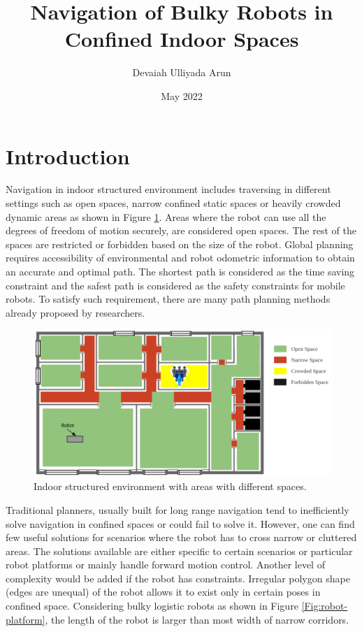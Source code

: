 \documentclass[rnd]{mas_proposal}
\title{Navigation of Bulky Robots in Confined Indoor Spaces}
\author{Devaiah Ulliyada Arun}
\date{May 2022}
\begin{document}
\maketitle

\pagestyle{plain}

\section{Introduction}
Navigation in indoor structured environment includes traversing in different settings such as open spaces, narrow confined static spaces or heavily crowded dynamic areas as shown in Figure \ref{Fig:indoor-map}. Areas where the robot can use all the degrees of freedom of motion securely, are considered open spaces. The rest of the spaces are restricted or forbidden based on the size of the robot. Global planning requires accessibility of environmental and robot odometric information to obtain an accurate and optimal path. The shortest path is considered as the time saving constraint and the safest path is considered as the safety constraints for mobile robots. To satisfy such requirement, there are many path planning methods already proposed by researchers.

\begin{figure}[!ht]
\centering
\includegraphics[scale=0.3]{images/Indoor_Map.png}
\caption{Indoor structured environment with areas with different spaces.}
\label{Fig:indoor-map}
\end{figure}

Traditional planners, usually built for long range navigation tend to inefficiently solve navigation in confined spaces or could fail to solve it. However, one can find few useful solutions for scenarios where the robot has to cross narrow or cluttered areas. The solutions available are either specific to certain scenarios or particular robot platforms or mainly handle forward motion control. Another level of complexity would be added if the robot has constraints. Irregular polygon shape (edges are unequal) of the robot allows it to exist only in certain poses in confined space. Considering bulky logistic robots as shown in Figure \ref{Fig:robot-platform}, the length of the robot is larger than most width of narrow corridors.
\end{document}
